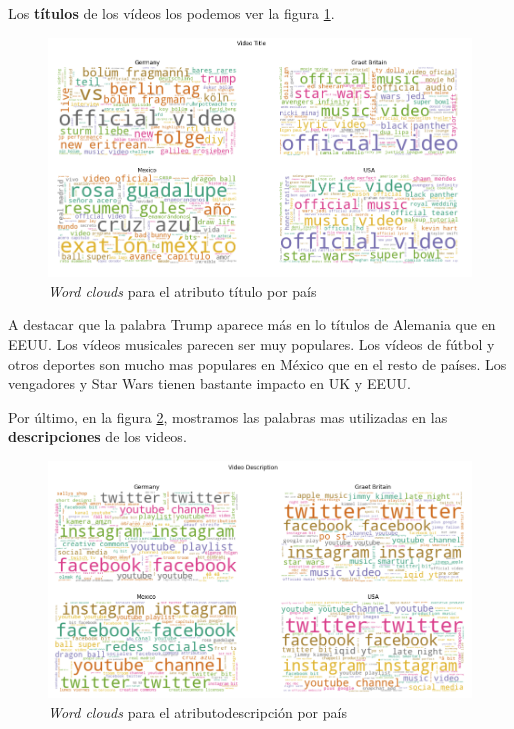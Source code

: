 \documentclass[a4paper,12pt]{article}
\begin{document}
Los \textbf{t\'itulos} de los v\'ideos los podemos ver la figura \ref{fig:colud_3}.  



\begin{figure}[h!]
\centering
\includegraphics[width=13cm]{wordcloud_title.png}
\caption{{\itshape Word clouds} para el atributo t\'itulo por pa\'is}
\label{fig:colud_3}
\end{figure}

A destacar que la palabra Trump aparece m\'as en lo t\'itulos de Alemania que en EEUU. Los v\'ideos musicales parecen ser muy populares. Los v\'ideos de f\'utbol y otros deportes son mucho mas populares en M\'exico que en el resto de pa\'ises. Los vengadores y Star Wars tienen bastante impacto en UK y EEUU.

Por \'ultimo, en la figura \ref{fig:colud_4},  mostramos las palabras mas utilizadas en las \textbf{descripciones} de los videos.

\begin{figure}[h!]
\centering

\includegraphics[width=13cm]{wordcould_desc.png}
\caption{{\itshape Word clouds} para el atributodescripci\'on  por pa\'is}
\label{fig:colud_4}
\end{figure}
\end{document}
